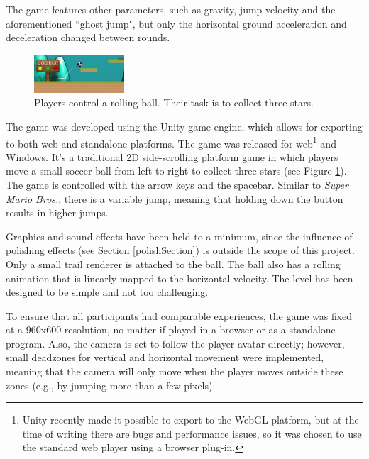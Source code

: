 The game features other parameters, such as gravity, jump velocity and the aforementioned ``ghost jump", but only the horizontal ground acceleration and deceleration changed between rounds.

\begin{figure}[htbp]
\centering
\includegraphics[width=0.3\textwidth]{Pics/gf}
\caption{Players control a rolling ball. Their task is to collect three stars.}
\label{fig:game}
\end{figure}

The game was developed using the Unity game engine, which allows for exporting to both web and standalone platforms. The game was released for web\footnote{Unity recently made it possible to export to the WebGL platform, but at the time of writing there are bugs and performance issues, so it was chosen to use the standard web player using a browser plug-in.} and Windows. It's a traditional 2D side-scrolling platform game in which players move a small soccer ball from left to right to collect three stars (see Figure \ref{fig:game}). The game is controlled with the arrow keys and the spacebar. Similar to \textit{Super Mario Bros.}, there is a variable jump, meaning that holding down the button results in higher jumps.

Graphics and sound effects have been held to a minimum, since the influence of polishing effects (see Section \ref{polishSection}) is outside the scope of this project. Only a small trail renderer is attached to the ball. The ball also has a rolling animation that is linearly mapped to the horizontal velocity. The level has been designed to be simple and not too challenging.

To ensure that all participants had comparable experiences, the game was fixed at a 960x600 resolution, no matter if played in a browser or as a standalone program. Also, the camera is set to follow the player avatar directly; however, small deadzones for vertical and horizontal movement were implemented, meaning that the camera will only move when the player moves outside these zones (e.g., by jumping more than a few pixels).